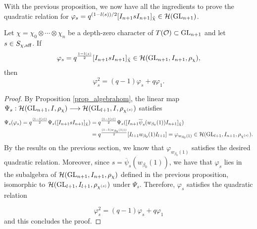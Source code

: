     With the previous proposition, we now have all the ingredients to prove the quadratic relation for $\varphi_s=q^{(1-l(s))/2}[I_{n+1}sI_{n+1}]_{\check{\chi}}\in\mathcal{H}(\mathrm{GL}_{n+1})$. 

    \begin{theorem}
        Let $\chi=\chi_0\otimes\cdots\otimes\chi_n$ be a depth-zero character of $T(\mathcal{O})\subset\mathrm{GL}_{n+1}$ and let $s\in S_{\chi,\mathrm{aff}}$. If $$\varphi_s=q^{\frac{1-l(s)}{2}}[I_{n+1}sI_{n+1}]_{\check{\chi}}\in\mathcal{H}(\mathrm{GL}_{n+1},I_{n+1},\rho_\chi),$$
        then
        $$\varphi_s^2=(q-1)\varphi_s+q\varphi_1.$$
    \end{theorem}
    \begin{proof}
        By Proposition \ref{prop_algebrahom}, the linear map $\Psi_s:\mathcal{H}(\mathrm{GL}_{n+1},I,\rho_\chi)\longrightarrow\mathcal{H}(\mathrm{GL}_{l+1},I,\rho_{\chi^{(s)}})$ satisfies
        \begin{align*}
            \Psi_s(\varphi_s)=q^{\frac{(1-l(s))}{2}}\Psi_s([I_{n+1}sI_{n+1}]_{\check{\chi}})&=q^{\frac{(1-l(s))}{2}}\Psi_s([I_{n+1}\overline{\psi}_s(w_{\beta_0}(1))I_{n+1}]_{\check{\chi}})\\
            &=q^{\frac{(1-l(w_{\beta_0}(1)))}{2}}[I_{l+1}w_{\beta_0}(1)I_{l+1}]=\varphi_{w_{\beta_0}(1)}\in\mathcal{H}(\mathrm{GL}_{l+1},I_{n+1},\rho_{\chi^{(s)}}).
        \end{align*}
        By the results on the previous section, we know that $\varphi_{w_{\beta_0}(1)}$ satisfies the desired quadratic relation. Moreover, since $s=\overline{\psi}_s(w_{\beta_0}(1))$, we have that $\varphi_s$ lies in the subalgebra of $\mathcal{H}(\mathrm{GL}_{n+1},I_{n+1},\rho_\chi)$ defined in the previous proposition, isomorphic to $\mathcal{H}(\mathrm{GL}_{l+1},I_{l+1},\rho_{\chi^{(s)}})$ under $\Psi_s$. Therefore, $\varphi_s$ satisfies the quadratic relation

        $$\varphi_s^2=(q-1)\varphi_s+q\varphi_1$$
        and this concludes the proof.
    \end{proof}
